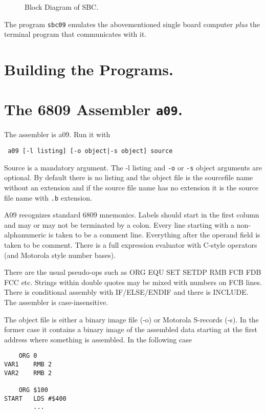 \begin{figure}

\caption{Block Diagram of SBC.}
\end{figure}

The program {\tt sbc09} emulates the abovementioned single board computer
{\em plus} the terminal program that communicates with it.

\chapter{Building the Programs.}

\chapter{The 6809 Assembler {\tt a09}.}

The assembler is a09. Run it with
\begin{verbatim}
 a09 [-l listing] [-o object|-s object] source
\end{verbatim}

Source is a mandatory argument. The -l listing and {\tt -o} or {\tt -s}
 object arguments are
optional. By default there is no listing and the object file is the
sourcefile name without an extension and if the source file name has no
extension it is the source file name with {\tt .b} extension. 

A09 recognizes standard 6809 mnemonics. Labels should start in the first
column and may or may not be terminated by a colon. Every line starting with
a non-alphanumeric is taken to be a comment line. Everything after the
operand field is taken to be comment. There is a full expression evaluator
with C-style operators (and Motorola style number bases). 

There are the usual pseudo-ops such as ORG EQU SET SETDP RMB FCB FDB FCC etc. 
Strings within double quotes may be mixed with numbers on FCB lines. There 
is conditional assembly with IF/ELSE/ENDIF and there is INCLUDE. The
assembler is case-insensitive.

The object file is either a binary image file (-o) or Motorola S-records (-s).
In the former case it contains a binary image of the assembled data starting
at the first address where something is assembled. In the following case
\begin{verbatim}
	ORG 0
VAR1	RMB 2
VAR2	RMB 2

	ORG $100
START	LDS #$400
        ...
\end{verbatim}

